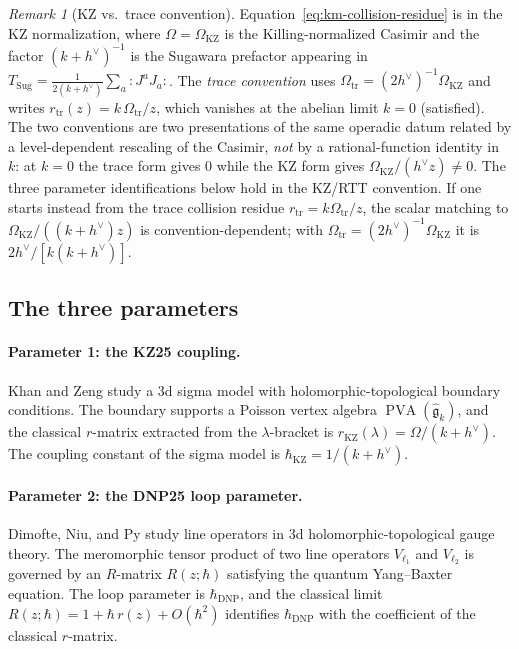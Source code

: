 \documentclass[11pt]{article}
\theoremstyle{plain}
\theoremstyle{definition}
\theoremstyle{remark}
\newtheorem{remark}[theorem]{Remark}
\newcommand{\fg}{\mathfrak{g}}
\numberwithin{equation}{section}
\begin{document}
\begin{remark}[KZ vs.\ trace convention]\label{rem:3hbar-kz-vs-trace}
Equation~\eqref{eq:km-collision-residue} is in the KZ normalization,
where $\Omega = \Omega_{\mathrm{KZ}}$ is the Killing-normalized
Casimir and the factor $(k+h^\vee)^{-1}$ is the Sugawara prefactor
appearing in $T_{\mathrm{Sug}} = \tfrac{1}{2(k+h^\vee)} \sum_a
{:}J^a J_a{:}$. The \emph{trace convention} uses $\Omega_{\mathrm{tr}}
= (2h^\vee)^{-1} \Omega_{\mathrm{KZ}}$ and writes $r_{\mathrm{tr}}(z)
= k\,\Omega_{\mathrm{tr}}/z$, which vanishes at the abelian limit
$k=0$ (satisfied). The two conventions are two presentations
of the same operadic datum related by a level-dependent rescaling
of the Casimir, \emph{not} by a rational-function identity in~$k$:
at $k = 0$ the trace form gives $0$ while the KZ form gives
$\Omega_{\mathrm{KZ}}/(h^\vee z) \neq 0$. The three parameter
identifications below hold in the KZ/RTT convention. If one starts
instead from the trace collision residue
$r_{\mathrm{tr}}=k\Omega_{\mathrm{tr}}/z$, the scalar matching to
$\Omega_{\mathrm{KZ}}/((k+h^\vee)z)$ is convention-dependent; with
$\Omega_{\mathrm{tr}}=(2h^\vee)^{-1}\Omega_{\mathrm{KZ}}$ it is
$2h^\vee/[k(k+h^\vee)]$.
\end{remark}

\subsection{The three parameters}

\paragraph{Parameter 1: the KZ25 coupling.}
Khan and Zeng \cite{KZ25} study a $3$d sigma model with
holomorphic-topological boundary conditions. The boundary supports a
Poisson vertex algebra $\operatorname{PVA}(\widehat{\fg}_k)$, and the
classical $r$-matrix extracted from the $\lambda$-bracket is
$r_{\mathrm{KZ}}(\lambda) = \Omega / (k + h^\vee)$. The coupling
constant of the sigma model is
$\hbar_{\mathrm{KZ}} = 1/(k + h^\vee)$.

\paragraph{Parameter 2: the DNP25 loop parameter.}
Dimofte, Niu, and Py \cite{DNP25} study line operators in $3$d
holomorphic-topological gauge theory. The meromorphic tensor product
of two line operators $V_{\ell_1}$ and $V_{\ell_2}$ is governed by an
$R$-matrix $R(z;\hbar)$ satisfying the quantum Yang--Baxter equation.
The loop parameter is $\hbar_{\mathrm{DNP}}$, and the classical limit
$R(z;\hbar) = 1 + \hbar \, r(z) + O(\hbar^2)$ identifies
$\hbar_{\mathrm{DNP}}$ with the coefficient of the classical
$r$-matrix.
\end{document}

